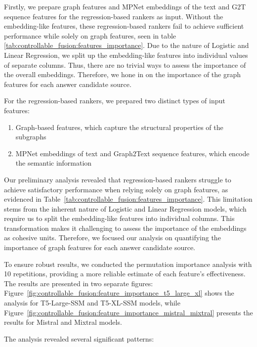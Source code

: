 Firstly, we prepare graph features and MPNet embeddings of the text and G2T sequence features for the regression-based rankers as input. Without the embedding-like features, these regression-based rankers fail to achieve sufficient performance while solely on graph features, seen in table \ref{tab:controllable_fusion:features_importance}. Due to the nature of Logistic and Linear Regression, we split up the embedding-like features into individual values of separate columns. Thus, there are no trivial ways to assess the importance of the overall embeddings. Therefore, we hone in on the importance of the graph features for each answer candidate source.

For the regression-based rankers, we prepared two distinct types of input features:
\begin{enumerate}
    \item Graph-based features, which capture the structural properties of the subgraphs
    \item MPNet embeddings of text and Graph2Text sequence features, which encode the semantic information
\end{enumerate}

Our preliminary analysis revealed that regression-based rankers struggle to achieve satisfactory performance when relying solely on graph features, as evidenced in Table~\ref{tab:controllable_fusion:features_importance}. This limitation stems from the inherent nature of Logistic and Linear Regression models, which require us to split the embedding-like features into individual columns. This transformation makes it challenging to assess the importance of the embeddings as cohesive units. Therefore, we focused our analysis on quantifying the importance of graph features for each answer candidate source.

To ensure robust results, we conducted the permutation importance analysis with 10 repetitions, providing a more reliable estimate of each feature's effectiveness. The results are presented in two separate figures: Figure~\ref{fig:controllable_fusion:feature_importance_t5_large_xl} shows the analysis for T5-Large-SSM and T5-XL-SSM models, while Figure~\ref{fig:controllable_fusion:feature_importance_mistral_mixtral} presents the results for Mistral and Mixtral models.

The analysis revealed several significant patterns:

